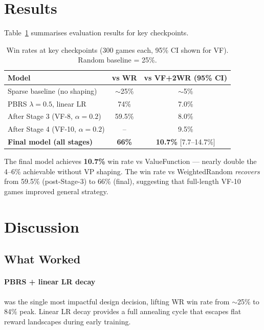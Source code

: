 \documentclass[10pt,twocolumn]{article}
\begin{document}
\section{Results}

Table~\ref{tab:results} summarises evaluation results for key checkpoints.

\begin{table}[H]
\centering
\caption{Win rates at key checkpoints (300 games each, 95\% CI shown for VF).
         Random baseline = 25\%.}
\label{tab:results}
\small
\begin{tabular}{@{}lcc@{}}
\toprule
Model & vs WR & vs VF+2WR (95\% CI) \\
\midrule
Sparse baseline (no shaping) & $\sim$25\% & $\sim$5\% \\
PBRS $\lambda{=}0.5$, linear LR & 74\% & 7.0\% \\
After Stage 3 (VF-8, $\alpha{=}0.2$) & 59.5\% & 8.0\% \\
After Stage 4 (VF-10, $\alpha{=}0.2$) & -- & 9.5\% \\
\textbf{Final model (all stages)} & \textbf{66\%} & \textbf{10.7\%} [7.7--14.7\%] \\
\bottomrule
\end{tabular}
\end{table}

The final model achieves \textbf{10.7\%} win rate vs ValueFunction --- nearly double
the 4--6\% achievable without VP shaping. The win rate vs WeightedRandom
\emph{recovers} from 59.5\% (post-Stage-3) to 66\% (final), suggesting that
full-length VF-10 games improved general strategy.

\section{Discussion}

\subsection{What Worked}

\paragraph{PBRS + linear LR decay} was the single most impactful design decision,
lifting WR win rate from $\sim$25\% to 84\% peak. Linear LR decay provides a full
annealing cycle that escapes flat reward landscapes during early training.
\end{document}
